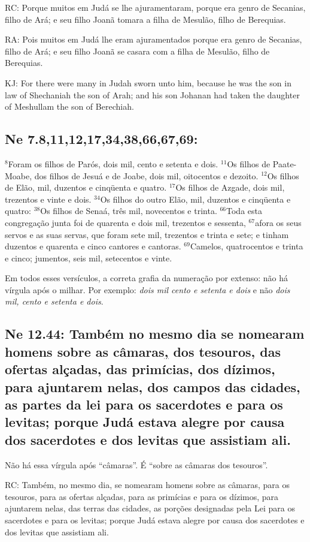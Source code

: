 RC: Porque muitos em Judá se lhe ajuramentaram, porque era genro de Secanias, filho de Ará; e seu filho Joanã tomara a filha de Mesulão, filho de Berequias.

RA: Pois muitos em Judá lhe eram ajuramentados porque era genro de Secanias, filho de Ará; e seu filho Joanã se casara com a filha de Mesulão, filho de Berequias.

KJ: For there were many in Judah sworn unto him, because he was the son in law of Shechaniah the son of Arah; and his son Johanan had taken the daughter of Meshullam the son of Berechiah.

\subsection{Ne 7.8,11,12,17,34,38,66,67,69:}

$^{\mathrm{8}}$Foram os filhos de Parós, dois mil, cento e setenta e
dois. $^{\mathrm{11}}$Os filhos de Paate-Moabe, dos filhos de Jesuá e
de Joabe, dois mil, oitocentos e dezoito. $^{\mathrm{12}}$Os filhos de
Elão, mil, duzentos e cinqüenta e quatro.  $^{\mathrm{17}}$Os filhos
de Azgade, dois mil, trezentos e vinte e dois. $^{\mathrm{34}}$Os
filhos do outro Elão, mil, duzentos e cinqüenta e quatro:
$^{\mathrm{38}}$Os filhos de Senaá, três mil, novecentos e trinta.
$^{\mathrm{66}}$Toda esta congregação junta foi de quarenta e dois
mil, trezentos e sessenta, $^{\mathrm{67}}$afora os seus servos e as
suas servas, que foram sete mil, trezentos e trinta e sete; e tinham
duzentos e quarenta e cinco cantores e cantoras.
$^{\mathrm{69}}$Camelos, quatrocentos e trinta e cinco; jumentos, seis
mil, setecentos e vinte.

Em todos esses versículos, a correta grafia da numeração por extenso:
não há vírgula após o milhar. Por exemplo: \emph{dois mil cento e
  setenta e dois} e não \emph{dois mil, cento e setenta e dois}.

\subsection{Ne 12.44: Também no mesmo dia se nomearam homens sobre as câmaras\uline{,} dos tesouros, das ofertas alçadas, das primícias, dos dízimos, para ajuntarem nelas, dos campos das cidades, as partes da lei para os sacerdotes e para os levitas; porque Judá estava alegre por causa dos sacerdotes e dos levitas que assistiam ali.}
Não há essa vírgula após ``câmaras''. É ``sobre as câmaras dos tesouros''.

RC: Também, no mesmo dia, se nomearam homens sobre as câmaras, para os tesouros, para as ofertas alçadas, para as primícias e para os dízimos, para ajuntarem nelas, das terras das cidades, as porções designadas pela Lei para os sacerdotes e para os levitas; porque Judá estava alegre por causa dos sacerdotes e dos levitas que assistiam ali.

